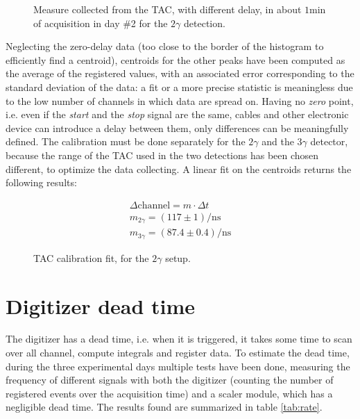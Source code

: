 \documentclass[11pt,a4 paper]{article}
\begin{document}
\begin{figure}
    \centering
    \caption{Measure collected from the TAC, with different delay, in about $1\si{\minute}$ of acquisition in day \#2 for the $2\gamma$ detection.}
    \label{fig:tachisto}
\end{figure}

Neglecting the zero-delay data (too close to the border of the histogram to efficiently find a centroid), centroids for the other peaks have been computed as the average of the registered values, with an associated error corresponding to the standard deviation of the data: a fit or a more precise statistic is meaningless due to the low number of channels in which data are spread on. Having no \emph{zero} point, i.e. even if the \emph{start} and the \emph{stop} signal are the same, cables and other electronic device can introduce a delay between them, only differences can be meaningfully defined. The calibration must be done separately for the $2\gamma$ and the $3\gamma$ detector, because the range of the TAC used in the two detections has been chosen different, to optimize the data collecting. A linear fit on the centroids returns the following results:

\begin{gather*}
    \Delta\text{channel}  = m \cdot \Delta t \\
    m_{2\gamma} = ( 117 \pm 1 )\si{\per\nano\second} \\
    m_{3\gamma} = ( 87.4 \pm 0.4 )\si{\per\nano\second}
\end{gather*}

\begin{figure}[H]
    \centering
    \caption{TAC calibration fit, for the $2\gamma$ setup.}
    \label{fig:tac_calibr_fit}
\end{figure}



\section{Digitizer dead time}
The digitizer has a dead time, i.e. when it is triggered, it takes some time to scan over all channel, compute integrals and register data. To estimate the dead time, during the three experimental days multiple tests have been done, measuring the frequency of different signals with both the digitizer (counting the number of registered events over the acquisition time) and a scaler module, which has a negligible dead time. The results found are summarized in table \ref{tab:rate}.
\end{document}

